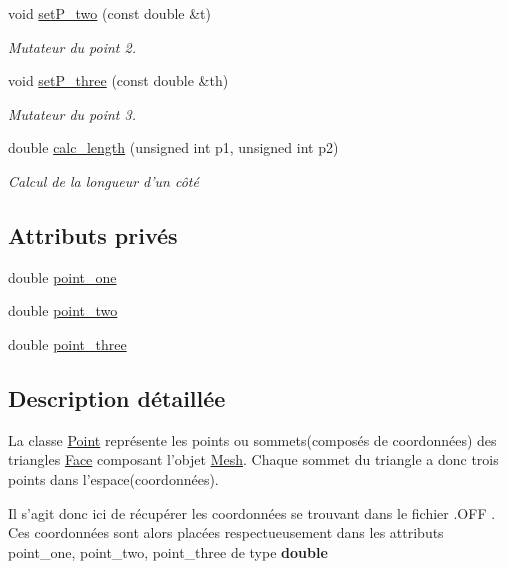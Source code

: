 \begin{DoxyCompactItemize}
void \hyperlink{class_point_a3b70e89e253f5339392990ae29313ae8}{set\-P\-\_\-two} (const double \&t)
\begin{DoxyCompactList}\small\item\em Mutateur du point 2. \end{DoxyCompactList}\item 
void \hyperlink{class_point_a097d97049b319bb131b51f990a52aa94}{set\-P\-\_\-three} (const double \&th)
\begin{DoxyCompactList}\small\item\em Mutateur du point 3. \end{DoxyCompactList}\item 
double \hyperlink{class_point_a6b523817c6565922eb02e15225ba4b82}{calc\-\_\-length} (unsigned int p1, unsigned int p2)
\begin{DoxyCompactList}\small\item\em Calcul de la longueur d'un côté \end{DoxyCompactList}\end{DoxyCompactItemize}
\subsection*{Attributs privés}
\begin{DoxyCompactItemize}
\item 
double \hyperlink{class_point_a030522c3949dc71bc4c1f39eb1b0c77e}{point\-\_\-one}
\item 
double \hyperlink{class_point_a7eece7f7413a741137cf32bb763f3987}{point\-\_\-two}
\item 
double \hyperlink{class_point_af7cb3c4c0c0f52218ac9ce180df003da}{point\-\_\-three}
\end{DoxyCompactItemize}


\subsection{Description détaillée}
La classe \hyperlink{class_point}{Point} représente les points ou sommets(composés de coordonnées) des triangles \hyperlink{class_face}{Face} composant l'objet \hyperlink{class_mesh}{Mesh}. Chaque sommet du triangle a donc trois points dans l'espace(coordonnées). \par
Il s'agit donc ici de récupérer les coordonnées se trouvant dans le fichier .O\-F\-F . Ces coordonnées sont alors placées respectueusement dans les attributs point\-\_\-one, point\-\_\-two, point\-\_\-three de type {\bfseries double} \par


